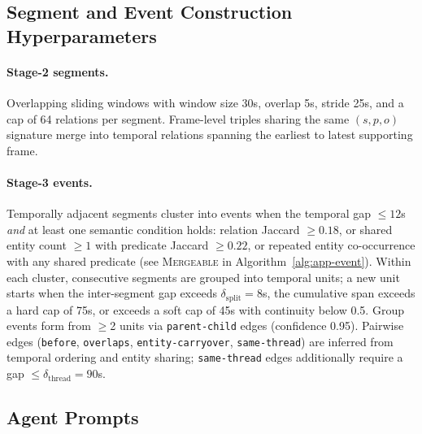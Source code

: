 \documentclass[sigconf, screen, review, anonymous]{acmart}
\begin{document}
\subsection{Segment and Event Construction Hyperparameters}
\label{sec:prompts-hyper}

\paragraph{Stage-2 segments.} Overlapping sliding windows with window size 30s, overlap 5s, stride 25s, and a cap of 64 relations per segment. Frame-level triples sharing the same $(s,p,o)$ signature merge into temporal relations spanning the earliest to latest supporting frame.

\paragraph{Stage-3 events.} Temporally adjacent segments cluster into events when the temporal gap $\le 12$s \emph{and} at least one semantic condition holds: relation Jaccard $\ge 0.18$, or shared entity count $\ge 1$ with predicate Jaccard $\ge 0.22$, or repeated entity co-occurrence with any shared predicate (see \textsc{Mergeable} in Algorithm~\ref{alg:app-event}). Within each cluster, consecutive segments are grouped into temporal units; a new unit starts when the inter-segment gap exceeds $\delta_{\mathrm{split}}=8$s, the cumulative span exceeds a hard cap of 75s, or exceeds a soft cap of 45s with continuity below 0.5. Group events form from $\geq$2 units via \texttt{parent-child} edges (confidence 0.95). Pairwise edges (\texttt{before}, \texttt{overlaps}, \texttt{entity-carryover}, \texttt{same-thread}) are inferred from temporal ordering and entity sharing; \texttt{same-thread} edges additionally require a gap $\le \delta_{\mathrm{thread}}=90$s.

\subsection{Agent Prompts}
\label{sec:prompts-agent}
\end{document}
